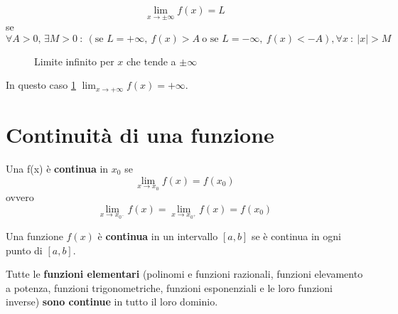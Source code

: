 \documentclass{book}
\begin{document}
\begin{definition}[Caso \(x_0 = \pm \infty \), \(L = \pm \infty\)]
    \[
        \lim_{x \to \pm \infty} f(x) = L
    \]
    se
    \[
        \forall A > 0, \, \exists M > 0 \ : \ (\text{se } L = +\infty, \ f(x) > A \ \text{o se } L = -\infty, \ f(x) < -A), \forall x \ : \ |x| > M
    \]
\end{definition}
\begin{figure}[H]
    \centering
    \caption{Limite infinito per \(x\) che tende a \(\pm\infty\)}
    \label{fig:limiteinfinitoinfinito}
\end{figure}
In questo caso \ref{fig:limiteinfinitoinfinito} \(\lim_{x \to +\infty} f(x) = +\infty\).

\section{Continuità di una funzione}
\begin{definition}
    Una f(x) è \textbf{continua} in \(x_0\) se
    \[\lim_{x \to x_0} f(x) = f(x_0)\]
    ovvero
    \[\lim_{x \to x_{0^-}} f(x) = \lim_{x \to x_{0^+}} f(x) = f(x_0)\]
\end{definition}
\begin{definition}
    Una funzione \(f(x)\) è \textbf{continua} in un intervallo \([a,b]\) se è continua in ogni punto di \([a,b]\).
\end{definition}
\begin{proposition}
    Tutte le \textbf{funzioni elementari} (polinomi e funzioni razionali,
    funzioni elevamento a potenza, funzioni trigonometriche, funzioni
    esponenziali e le loro funzioni inverse) \textbf{sono continue} in tutto il loro
    dominio.
\end{proposition}
\end{document}
